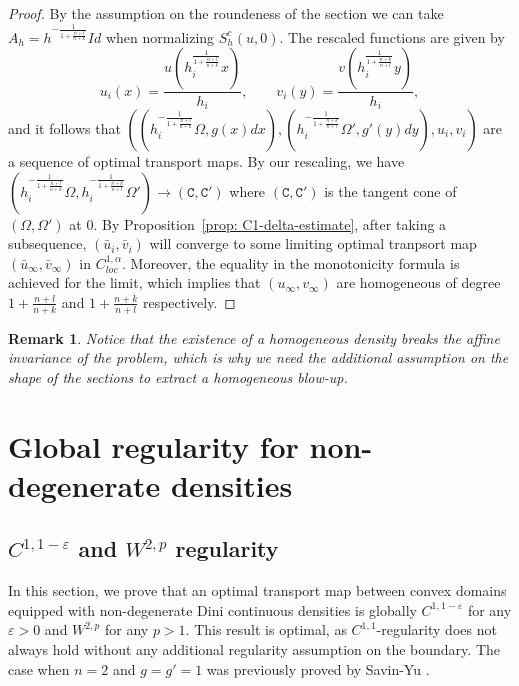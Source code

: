 \documentclass[12pt,reqno]{amsart}
\newtheorem{remark}{Remark}[section]
\newcommand{\eps}{\varepsilon}
\numberwithin{equation}{section}
\begin{document}
        \begin{proof}
            By the assumption on the roundeness of the section we can take $A_h = h^{-\frac{1}{1+\frac{n+l}{n+k}}}Id$ when normalizing $S_h^c(u, 0)$. The rescaled functions are given by
            \[u_i(x) = \frac{u(h_i^{\frac{1}{1+\frac{n+l}{n+k}}}x)}{h_i}, \qquad v_i(y) = \frac{v(h_i^{\frac{1}{1+\frac{n+k}{n+l}}}y)}{h_i},\]
            and it follows that $((h_i^{-\frac{1}{1+\frac{n+l}{n+k}}}\Omega, g(x)dx), (h_i^{-\frac{1}{1+\frac{n+k}{n+l}}}\Omega', g'(y)dy), u_i, v_i)$ are a sequence of optimal transport maps. By our rescaling, we have $(h_i^{-\frac{1}{1+\frac{n+l}{n+k}}}\Omega, h_i^{-\frac{1}{1+\frac{n+k}{n+l}}}\Omega')\to (\mathtt C, \mathtt C')$ where $(\mathtt C, \mathtt C')$ is the tangent cone of $(\Omega, \Omega')$ at $0$. By Proposition~\ref{prop: C1-delta-estimate}, after taking a subsequence, $(\bar u_i, \bar v_i)$ will converge to some limiting optimal tranpsort map $ (\bar u_{\infty}, \bar v_{\infty})$ in $C^{1, \alpha}_{loc}$. Moreover, the equality in the monotonicity formula is achieved for the limit, which implies that $(u_{\infty}, v_{\infty})$ are homogeneous of degree $1+\frac{n+l}{n+k}$ and $1+\frac{n+k}{n+l}$ respectively. 
        \end{proof}

        \begin{remark}
            Notice that the existence of a homogeneous density breaks the affine invariance of the problem, which is why we need the additional assumption on the shape of the sections to extract a homogeneous blow-up. 
        \end{remark}

\section{Global regularity for non-degenerate densities}\label{sec: C-1-1-eps-regularity}
\subsection{$C^{1, 1-\eps}$ and $W^{2, p}$ regularity}

	In this section, we prove that an optimal transport map between convex domains equipped with non-degenerate Dini continuous densities is globally $C^{1, 1-\eps}$ for any $\eps>0$ and $W^{2, p}$ for any $p>1$. This result is optimal, as $C^{1, 1}$-regularity does not always hold without any additional regularity assumption on the boundary. The case when $n = 2$ and $g = g' = 1$ was previously proved by Savin-Yu \cite{Savin-Yu}. 
\end{document}
